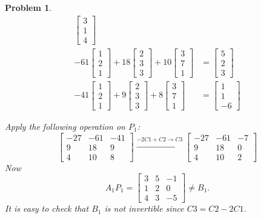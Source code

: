 \documentclass{article}
\theoremstyle{pprop}
\newtheorem{problem}{Problem}[section]
\begin{document}
\begin{problem}
\begin{align*}
\begin{bmatrix} 3 \\ 1 \\ 4 \end{bmatrix}\\
-61 \begin{bmatrix} 1 \\ 2 \\ 1 \end{bmatrix}
+
18 \begin{bmatrix} 2 \\ 3 \\ 3 \end{bmatrix}
+
10 \begin{bmatrix} 3 \\ 7 \\ 1 \end{bmatrix}&=
\begin{bmatrix} 5 \\ 2 \\ 3 \end{bmatrix}\\
-41 \begin{bmatrix} 1 \\ 2 \\ 1 \end{bmatrix}
+
9 \begin{bmatrix} 2 \\ 3 \\ 3 \end{bmatrix}
+
8 \begin{bmatrix} 3 \\ 7 \\ 1 \end{bmatrix}&=
\begin{bmatrix} 1 \\ 1 \\ -6 \end{bmatrix}
\end{align*}

Apply the following operation on $P_1$:
$$
\left[\begin{matrix}-27 & -61 & -41\\9 & 18 & 9\\4 & 10 & 8\end{matrix}\right]
\xrightarrow{-2C1+C2 \to C3}
\left[\begin{matrix}-27 & -61 & -7\\9 & 18 & 0\\4 & 10 & 2\end{matrix}\right]
$$
Now 
$$
A_1P_1=
\left[\begin{matrix}3 & 5 & -1\\1 & 2 & 0\\4 & 3 & -5\end{matrix}\right]
\neq B_1.
$$
It is easy to check that $B_1$ is not invertible since $C3=C2-2C1$.
\end{problem}
\end{document}
